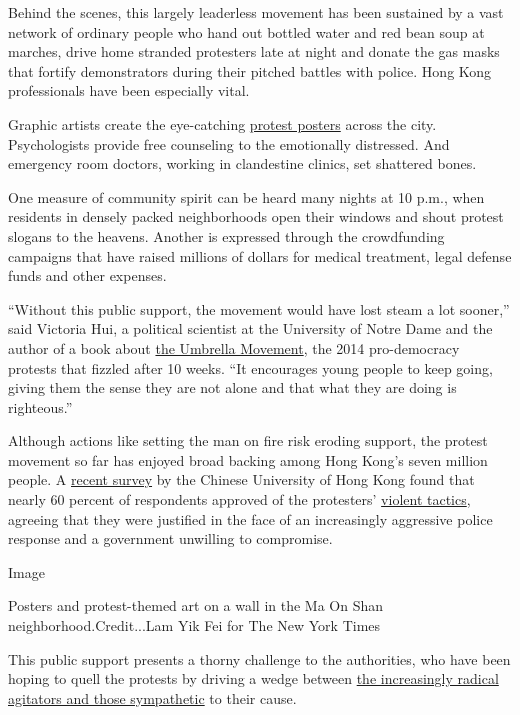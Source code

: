 Behind the scenes, this largely leaderless movement has been sustained
by a vast network of ordinary people who hand out bottled water and red
bean soup at marches, drive home stranded protesters late at night and
donate the gas masks that fortify demonstrators during their pitched
battles with police. Hong Kong professionals have been especially vital.

Graphic artists create the eye-catching
\href{https://www.nytimes3xbfgragh.onion/2019/10/11/world/asia/hong-kong-protest-art.html}{protest
posters} across the city. Psychologists provide free counseling to the
emotionally distressed. And emergency room doctors, working in
clandestine clinics, set shattered bones.

One measure of community spirit can be heard many nights at 10 p.m.,
when residents in densely packed neighborhoods open their windows and
shout protest slogans to the heavens. Another is expressed through the
crowdfunding campaigns that have raised millions of dollars for medical
treatment, legal defense funds and other expenses.

``Without this public support, the movement would have lost steam a lot
sooner,'' said Victoria Hui, a political scientist at the University of
Notre Dame and the author of a book about
\href{https://www.nytimes3xbfgragh.onion/2019/04/23/world/asia/hong-kong-umbrella-movement.html}{the
Umbrella Movement}, the 2014 pro-democracy protests that fizzled after
10 weeks. ``It encourages young people to keep going, giving them the
sense they are not alone and that what they are doing is righteous.''

Although actions like setting the man on fire risk eroding support, the
protest movement so far has enjoyed broad backing among Hong Kong's
seven million people. A
\href{https://www.independent.co.uk/voices/hong-kong-protests-police-violence-public-opinion-polling-support-a9158061.html}{recent
survey} by the Chinese University of Hong Kong found that nearly 60
percent of respondents approved of the protesters'
\href{https://www.nytimes3xbfgragh.onion/2019/10/27/world/asia/hong-kong-protests.html}{violent
tactics}, agreeing that they were justified in the face of an
increasingly aggressive police response and a government unwilling to
compromise.

Image

Posters and protest-themed art on a wall in the Ma On Shan
neighborhood.Credit...Lam Yik Fei for The New York Times

This public support presents a thorny challenge to the authorities, who
have been hoping to quell the protests by driving a wedge between
\href{https://www.nytimes3xbfgragh.onion/2019/09/27/world/asia/hong-kong-protests-identity.html}{the
increasingly radical agitators and those sympathetic} to their cause.

